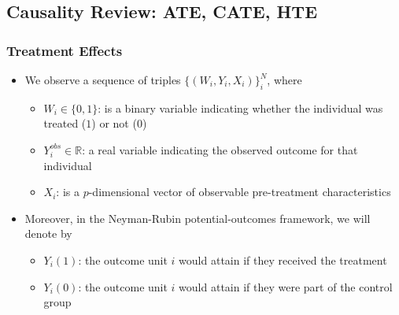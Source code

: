 \documentclass[
  shownotes,
  xcolor={svgnames},
  hyperref={colorlinks,citecolor=DarkBlue,linkcolor=DarkRed,urlcolor=DarkBlue}
  , aspectratio=169]{beamer}
\begin{document}
\subsection{Causality Review: ATE, CATE, HTE}
\begin{frame}[fragile]
\frametitle{Treatment Effects}

\begin{itemize}
\item We observe a sequence of triples $\{(W_i, Y_i, X_i)\}_{i}^{N}$, where
\medskip

\begin{itemize}

\item \(W_{i} \in \{0, 1\}\): is a binary variable indicating whether the individual was treated (\(1\)) or not (\(0\))
\medskip
\item \(Y_{i}^{obs} \in \mathbb{R}\): a real variable indicating the observed outcome for that individual
\medskip
\item \(X_{i}\): is a \(p\)-dimensional vector of observable pre-treatment characteristics
\end{itemize}
\medskip
 \item Moreover, in the Neyman-Rubin potential-outcomes framework, we will denote by 
 \medskip
 \begin{itemize}
\item \(Y_{i}(1)\): the outcome unit \(i\) would attain if they received the  treatment
\medskip
\item \(Y_{i}(0)\): the outcome unit \(i\) would attain if they were part of the control group
\end{itemize}

\end{itemize}



\end{frame}
\end{document}

